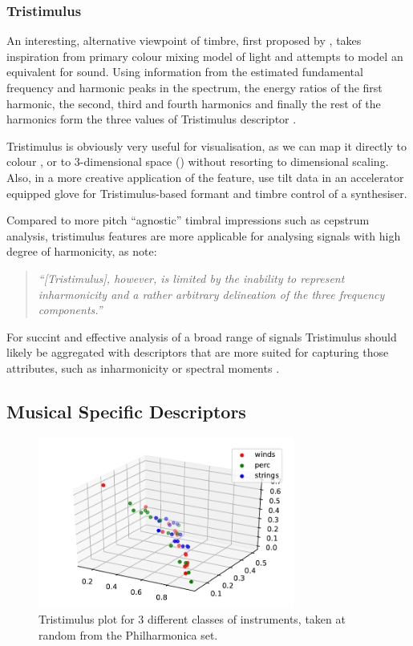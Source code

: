 {{{{\subsubsection{Tristimulus}

An interesting, alternative viewpoint of timbre, first proposed by \cite{Pollard1982}, takes inspiration from primary colour mixing model of light and attempts to model an equivalent for sound. Using information from the estimated fundamental frequency and harmonic peaks in the spectrum, the energy ratios of the first harmonic, the second, third and fourth harmonics and finally the rest of the harmonics form the three values of Tristimulus descriptor \citep{Peeters2004b}.

Tristimulus is obviously very useful for visualisation, as we can map it directly to colour \citep{Sequera2006}, or to 3-dimensional space  () without resorting to dimensional scaling. Also, in a more creative application of the feature, \cite{Fox2005a} use tilt data in an accelerator equipped glove for Tristimulus-based formant and timbre control of a synthesiser. 

Compared to more pitch ``agnostic'' timbral impressions such as cepstrum analysis, tristimulus features are more applicable for analysing signals with high degree of harmonicity, as \cite{Terasawa2006} note: 

\blockquote{\textit{
``[Tristimulus], however, is limited by the inability to represent inharmonicity and a rather arbitrary delineation of the three frequency components.''}
}

For succint and effective analysis of a broad range of signals Tristimulus should likely be aggregated with descriptors that are more suited for capturing those attributes, such as inharmonicity or spectral moments \citep{Peeters2004b,Chudy2010}.
 
\subsection{Musical Specific Descriptors}

\begin{figure}
	\begin{center}
		\includegraphics[width=0.75\textwidth]{ch05_pyconcat/figures/tristimulus.pdf}
	\end{center}
	\caption[Tristimulus plot for 3 different classes of instruments]{Tristimulus plot for 3 different classes of instruments, taken at random from the Philharmonica set.}
	\label{fig:tristimulus}
\end{figure}

}}}}
